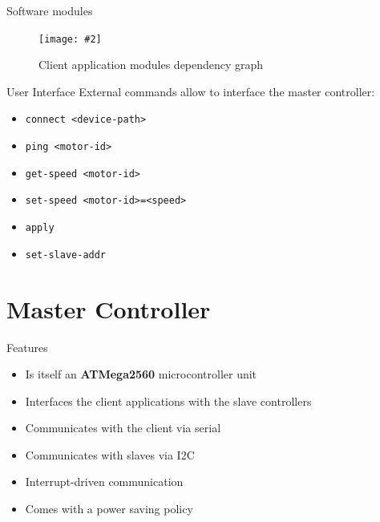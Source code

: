 \documentclass{beamer}
\newcommand*{\LimitedIncludeGraphics}[2][]{%
\begin{adjustbox}{max size={\textwidth}{\textheight}}
    \texttt{[image: \#2]}%
\end{adjustbox}
}
\begin{document}
\begin{frame}{Software modules}
\begin{figure}
  \centering
  \LimitedIncludeGraphics{../source/images/client-deps.png}
  \caption{Client application modules dependency graph}
\end{figure}
\end{frame}

\begin{frame}{User Interface}
External commands allow to interface the master controller:

\begin{itemize}
  \item \texttt{connect\ \textless{}device-path\textgreater{}}
  \item \texttt{ping\ \textless{}motor-id\textgreater{}}
  \item \texttt{get-speed\ \textless{}motor-id\textgreater{}}
  \item \texttt{set-speed\ \textless{}motor-id\textgreater{}=\textless{}speed\textgreater{}}
  \item \texttt{apply}
  \item \texttt{set-slave-addr}
\end{itemize}
\end{frame}

\hypertarget{master-controller}{%
\section{Master Controller}\label{master-controller}}

\begin{frame}{Features}
\begin{itemize}
  \item Is itself an \textbf{ATMega2560} microcontroller unit
  \item Interfaces the client applications with the slave controllers
  \item Communicates with the client via serial
  \item Communicates with slaves via I2C
  \item Interrupt-driven communication
  \item Comes with a power saving policy
\end{itemize}
\end{frame}
\end{document}
